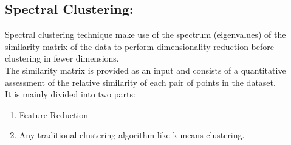 \documentclass{report}
\begin{document}
\subsection{Spectral Clustering:}
Spectral clustering technique make use of the spectrum (eigenvalues) of the similarity matrix of the data to perform dimensionality reduction before clustering in fewer dimensions.\\
The similarity matrix is provided as an input and consists of a quantitative assessment of the relative similarity of each pair of points in the dataset.\\
\linebreak
It is mainly divided into two parts: 
\begin{enumerate}[label=\arabic*.]
\item Feature Reduction
\item Any traditional clustering algorithm like k-means clustering.
\end{enumerate}
\end{document}
